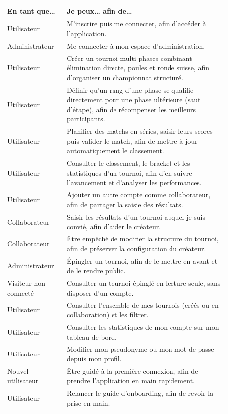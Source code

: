 \begin{table}[H]
    \centering
    \small
    \renewcommand{\arraystretch}{1.6}
    \begin{tabular}{|>{\raggedright\arraybackslash}p{0.23\linewidth}|>{\raggedright\arraybackslash}p{0.65\linewidth}|}
        \hline
        \textbf{En tant que…} & \textbf{Je peux… afin de…} \\
        \hline
        Utilisateur & M'inscrire puis me connecter, afin d'accéder à l'application. \\
        \hline
        Administrateur & Me connecter à mon espace d'administration. \\
        \hline
        Utilisateur & Créer un tournoi multi-phases combinant élimination directe, poules et ronde suisse, afin d'organiser un championnat structuré. \\
        \hline
        Utilisateur & Définir qu'un rang d'une phase se qualifie directement pour une phase ultérieure (saut d'étape), afin de récompenser les meilleurs participants. \\
        \hline
        Utilisateur & Planifier des matchs en séries, saisir leurs scores puis valider le match, afin de mettre à jour automatiquement le classement. \\
        \hline
        Utilisateur & Consulter le classement, le bracket et les statistiques d'un tournoi, afin d'en suivre l'avancement et d'analyser les performances. \\
        \hline
        Utilisateur & Ajouter un autre compte comme collaborateur, afin de partager la saisie des résultats. \\
        \hline
        Collaborateur & Saisir les résultats d'un tournoi auquel je suis convié, afin d'aider le créateur. \\
        \hline
        Collaborateur & Être empêché de modifier la structure du tournoi, afin de préserver la configuration du créateur. \\
        \hline
        Administrateur & Épingler un tournoi, afin de le mettre en avant et de le rendre public. \\
        \hline
        Visiteur non connecté & Consulter un tournoi épinglé en lecture seule, sans disposer d'un compte. \\
        \hline
        Utilisateur & Consulter l'ensemble de mes tournois (créés ou en collaboration) et les filtrer. \\
        \hline
        Utilisateur & Consulter les statistiques de mon compte sur mon tableau de bord. \\
        \hline
        Utilisateur & Modifier mon pseudonyme ou mon mot de passe depuis mon profil. \\
        \hline
        Nouvel utilisateur & Être guidé à la première connexion, afin de prendre l'application en main rapidement. \\
        \hline
        Utilisateur & Relancer le guide d'onboarding, afin de revoir la prise en main. \\
        \hline
    \end{tabular}
\end{table}

